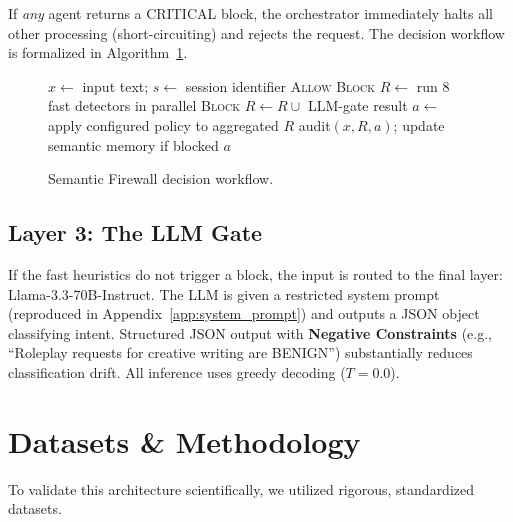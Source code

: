 \documentclass[conference]{IEEEtran}
\begin{document}
If \textit{any} agent returns a CRITICAL block, the orchestrator immediately halts all other processing (short-circuiting) and rejects the request. The decision workflow is formalized in Algorithm~\ref{alg:workflow}.

\begin{figure}[htbp]
\begin{algorithmic}[1]
\STATE $x \leftarrow$ input text; $s \leftarrow$ session identifier
    \RETURN \textsc{Allow}
\ENDIF
{}
    \RETURN \textsc{Block}
\ENDIF
\STATE $R \leftarrow$ run 8 fast detectors in parallel
    \RETURN \textsc{Block} 
\ENDIF
{}
    \STATE $R \leftarrow R \cup$ LLM-gate result
\ENDIF
\STATE $a \leftarrow$ apply configured policy to aggregated $R$
\STATE audit$(x, R, a)$; update semantic memory if blocked
\RETURN $a$
\end{algorithmic}
\caption{Semantic Firewall decision workflow.}
\label{alg:workflow}
\end{figure}

\subsection{Layer 3: The LLM Gate}
If the fast heuristics do not trigger a block, the input is routed to the final layer: Llama-3.3-70B-Instruct. The LLM is given a restricted system prompt (reproduced in Appendix~\ref{app:system_prompt}) and outputs a JSON object classifying intent. Structured JSON output with \textbf{Negative Constraints} (e.g., ``Roleplay requests for creative writing are BENIGN'') substantially reduces classification drift. All inference uses greedy decoding ($T{=}0.0$).

\section{Datasets \& Methodology}

To validate this architecture scientifically, we utilized rigorous, standardized datasets.
\end{document}
